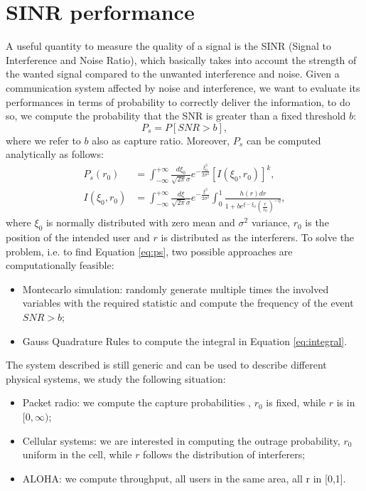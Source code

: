 \documentclass[twoside,onecolumn]{article}
\theoremstyle{definition}
\begin{document}
\section{SINR performance}
A useful quantity to measure the quality of a signal is the SINR (Signal to Interference and Noise Ratio), which basically takes into account the strength of the wanted signal compared to the unwanted interference and noise. Given a communication system affected by noise and interference, we want to evaluate its performances in terms of probability to correctly deliver the information, to do so, we compute the probability that the SNR is greater than a fixed threshold $b$:
\begin{equation}\label{eq:ps}
P_s=P[SNR>b],
\end{equation}
where we refer to $b$ also as capture ratio. Moreover, $P_s$ can be computed analytically as follows:
\begin{equation}\begin{split}\label{eq:integral}
P_s(r_0)& = \int_{-\infty}^{+\infty}\frac{d\xi_0}{\sqrt{2\pi}\sigma}e^{-\frac{\xi_0^2}{2\sigma^2}}[I(\xi_0,r_0)]^k,\\
I(\xi_0,r_0)&=\int_{-\infty}^{+\infty}\frac{d\xi}{\sqrt{2\pi}\sigma}e^{-\frac{\xi^2}{2\sigma^2}}\int_0^1\frac{h(r)dr}{1+be^{\xi-\xi_0}(\frac{r}{r_0})^{-\eta}},
\end{split}\end{equation}
where $\xi_0$ is normally distributed with zero mean and $\sigma^2$ variance, $r_0$ is the position of the intended user and $r$ is distributed as the interferers.
To solve the problem, i.e. to find Equation \ref{eq:ps}, two possible approaches are computationally feasible: 
\begin{itemize}
\item Montecarlo simulation: randomly generate multiple times the involved variables with the required statistic and compute the frequency of the event $SNR>b$;
\item  Gauss Quadrature Rules to compute the integral in Equation \ref{eq:integral}.
\end{itemize}
The system described is still generic and can be used to describe different physical systems, we study the following situation:
\begin{itemize}
\item Packet radio: we compute the capture probabilities , $r_0$ is fixed, while $r$ is in $[0,\infty)$;
\item Cellular systems: we are interested in computing the outrage probability, $r_0$ uniform in the cell, while $r$ follows the distribution of interferers;
\item ALOHA: we compute throughput, all users in the same area, all r in [0,1].
\end{itemize}
\end{document}
